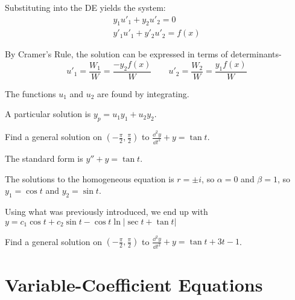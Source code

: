 \documentclass[../diffeq.tex]{subfiles}
\begin{document}
Substituting into the DE yields the system:
\begin{align*}
y_1u'_1+y_2u'_2=0 \\
y'_1u'_1+y'_2u'_2 = f(x)
\end{align*}

By Cramer's Rule, the solution can be expressed in terms of determinants- 
\[ u'_1=\frac{W_1}{W}=\frac{-y_2f(x)}{W} \qquad u'_2=\frac{W_2}{W}=\frac{y_1f(x)}{W} \]

The functions $u_1$ and $u_2$ are found by integrating.

A particular solution is $y_p=u_1y_1+u_2y_2$.

\begin{example}
    Find a general solution on $(-\frac{\pi}{2},\frac{\pi}{2})$ to $\frac{\dd^2 y}{\dd t^2}+y=\tan t$.

    The standard form is $y''+y=\tan t$.

    The solutions to the homogeneous equation is $r=\pm i$, so $\alpha = 0$ and $\beta = 1$, so $y_1=\cos t$ and $y_2=\sin t$.

    Using what was previously introduced, we end up with $y=c_1\cos t + c_2\sin t - \cos t \ln|\sec t+\tan t|$
\end{example}

\ex Find a general solution on $(-\frac{\pi}{2},\frac{\pi}{2})$ to $\frac{\dd^2 y}{\dd t^2}+y=\tan t + 3t - 1$.

\section{Variable-Coefficient Equations}
\end{document}
